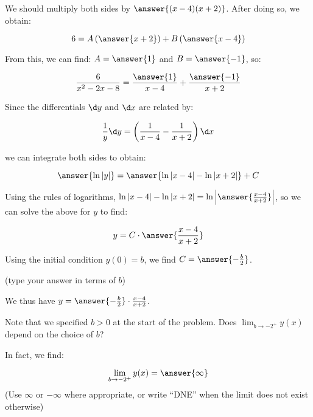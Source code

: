 \documentclass{ximera}
\begin{document}
\begin{exercise}
\begin{exercise}
\begin{hint}
\begin{question}
We should multiply both sides by $\answer{(x-4)(x+2)}$.  After doing so, we obtain:

\[
6=A\left(\answer{x+2}\right)+B\left(\answer{x-4}\right)
\]

From this, we can find: $A=\answer{1}$ and $B=\answer{-1}$, so:

\[
\frac{6}{x^2-2x-8} = \frac{\answer{1}}{x-4}+\frac{\answer{-1}}{x+2}
\]


\begin{question}
Since the differentials $\d y$ and $\d x$ are related by:

\[
\frac{1}{y}  \d y = \left(\frac{1}{x-4}-\frac{1}{x+2} \right) \d x
\]

we can integrate both sides to obtain:

\[
\answer{\ln|y|} = \answer{\ln|x-4| - \ln|x+2|} +C\\
\]

Using the rules of logarithms, $ \ln|x-4| - \ln|x+2| =  \ln\left| \answer{\frac{x-4}{x+2}} \right|$, so we can solve the above for $y$ to find:

\[
y= C \cdot \answer{\frac{x-4}{x+2}} \\
\]
  
\begin{question}  
Using the initial condition $y(0)=b$, we find $C=\answer{-\frac{b}{2}}$.

(type your answer in terms of $b$)

We thus have $y = \answer{-\frac{b}{2}} \cdot \frac{x-4}{x+2}$.


\end{question}
\end{question}
\end{question}
 \end{hint}
 
\begin{exercise}
Note that we specified $b>0$ at the start of the problem.  Does $\lim_{b \to -2^+} y(x)$ depend on the choice of $b$?
\begin{multipleChoice}
\end{multipleChoice}
In fact, we find:

\[
\lim_{b \to -2^+} y(x) = \answer{\infty}
\]
(Use $\infty$ or $-\infty$ where appropriate, or write ``DNE'' when the limit does not exist otherwise)
\end{exercise}
 \end{exercise}
\end{exercise}
\end{document}
